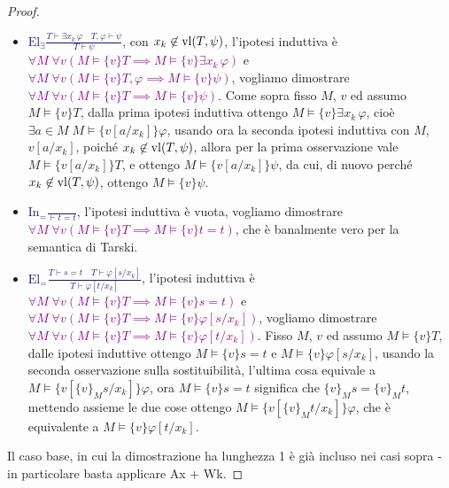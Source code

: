 \begin{proof}
\begin{itemize}
        quindi posso prendere $a := \{v\}_M t$ e concludere $M \models \{v[a/x_k]\}\varphi$.
        \item \textcolor{MidnightBlue}{$\displaystyle\text{El}_\exists \frac{T \vdash \exists x_k\,\varphi \quad T,\varphi \vdash \psi}{T \vdash \psi}$}, con $x_k \not\in \operatorname{vl}(T,\psi)$, l'ipotesi induttiva è \textcolor{purple}{$\forall M \; \forall v (M \models \{v\}T \implies M \models \{v\}\exists x_k\,\varphi)$} e \textcolor{purple}{$\forall M \; \forall v (M \models \{v\}T,\varphi \implies M \models \{v\}\psi)$}, vogliamo dimostrare
        \textcolor{purple}{$\forall M \; \forall v (M \models \{v\}T \implies M \models \{v\}\psi)$}. Come sopra fisso $M$, $v$ ed assumo $M \models \{v\}T$, dalla prima ipotesi induttiva ottengo $M \models \{v\}\exists x_k\,\varphi$, cioè $\exists a \in M \; M \models\{v[a/x_k]\} \varphi$, usando ora la seconda ipotesi induttiva con $M$, $v[a/x_k]$, poiché $x_k \not \in \operatorname{vl}(T,\psi)$, allora per la prima osservazione vale $M \models \{v[a/x_k]\}T$, e ottengo $M \models \{v[a/x_k]\}\psi$, da cui, di nuovo perché $x_k \not\in \operatorname{vl}(T,\psi)$, ottengo $M \models \{v\}\psi$.
        \item \textcolor{MidnightBlue}{$\displaystyle\text{In}_= \frac{}{\vdash t = t}$}, l'ipotesi induttiva è vuota, vogliamo dimostrare \textcolor{purple}{$\forall M \; \forall v (M \models \{v\}T \implies M \models \{v\} t = t)$}, che è banalmente vero per la semantica di Tarski.
        \item \textcolor{MidnightBlue}{$\displaystyle\text{El}_= \frac{T \vdash s = t \quad T \vdash \varphi[s/x_k]}{T \vdash \varphi[t/x_k]}$}, l'ipotesi induttiva è \textcolor{purple}{$\forall M \; \forall v (M \models \{v\}T \implies M \models \{v\}s = t)$} e \textcolor{purple}{$\forall M \; \forall v (M \models \{v\}T \implies M \models \{v\}\varphi[s/x_k])$}, vogliamo dimostrare \textcolor{purple}{$\forall M \; \forall v (M \models \{v\}T \implies M \models \{v\}\varphi[t/x_k])$}.
        Fisso $M$, $v$ ed assumo $M \models\{v\}T$, dalle ipotesi induttive ottengo $M \models \{v\}s = t$ e $M \models \{v\}\varphi[s/x_k]$, usando la seconda osservazione sulla sostituibilità, l'ultima cosa equivale a $M \models \{v[\{v\}_M s/x_k]\}\varphi$, ora $M \models \{v\}s = t$ significa che $\{v\}_M s = \{v\}_M t$, mettendo assieme le due cose ottengo $M \models \{v[\{v\}_M t/x_k]\}\varphi$, che è equivalente a $M \models \{v\}\varphi[t/x_k]$.
    \end{itemize}
    Il caso base, in cui la dimostrazione ha lunghezza 1 è già incluso nei casi sopra - in particolare basta applicare Ax + Wk.
\end{proof}

